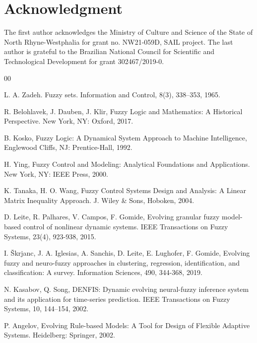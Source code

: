 \documentclass[conference]{IEEEtran}
\begin{document}
\section*{Acknowledgment}

The first author acknowledges the Ministry of Culture and Science of the State of North Rhyne-Westphalia for grant no. NW21-059D, SAIL project. The last author is grateful to the Brazilian National Council for Scientific and Technological Development for grant 302467/2019-0.

\vspace{1cm}

\color{black}

\begin{thebibliography}{00}

 L. A. Zadeh. Fuzzy sets. Information and Control, 8(3), 338–353, 1965.

 R. Belohlavek, J. Dauben, J. Klir, Fuzzy Logic and Mathematics: A Historical Perspective. New York, NY: Oxford, 2017.

 B. Kosko, Fuzzy Logic: A Dynamical System Approach to Machine Intelligence, Englewood Cliffs, NJ: Prentice-Hall, 1992.

 H. Ying, Fuzzy Control and Modeling: Analytical Foundations and Applications. New York, NY: IEEE Press, 2000.

 K. Tanaka, H. O. Wang, Fuzzy Control Systems Design and Analysis: A Linear Matrix Inequality Approach. J. Wiley \& Sons, Hoboken, 2004.

 D. Leite, R. Palhares, V. Campos, F. Gomide, Evolving granular fuzzy model-based control of nonlinear dynamic systems. IEEE Transactions on Fuzzy Systems, 23(4), 923-938, 2015.

 I. Škrjanc, J. A. Iglesias, A. Sanchis, D. Leite, E. Lughofer, F. Gomide, Evolving fuzzy and neuro-fuzzy approaches in clustering, regression, identification, and classification: A survey. Information Sciences, 490, 344-368, 2019.

 N. Kasabov, Q. Song, DENFIS: Dynamic evolving neural-fuzzy inference system and its application for time-series prediction. IEEE Transactions on Fuzzy Systems, 10, 144–154, 2002.

 P. Angelov, Evolving Rule-based Models: A Tool for Design of Flexible Adaptive Systems. Heidelberg: Springer, 2002.


\end{thebibliography}
\end{document}
